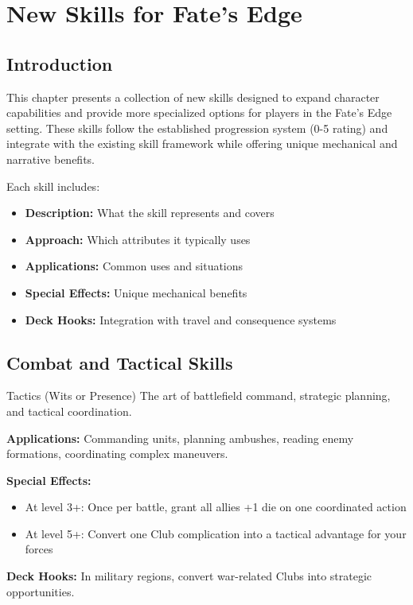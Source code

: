 \documentclass[11pt]{report}
\begin{document}
\chapter{New Skills for Fate's Edge}

\section*{Introduction}

This chapter presents a collection of new skills designed to expand character capabilities and provide more specialized options for players in the Fate's Edge setting. These skills follow the established progression system (0-5 rating) and integrate with the existing skill framework while offering unique mechanical and narrative benefits.

Each skill includes:
\begin{itemize}
    \item \textbf{Description:} What the skill represents and covers
    \item \textbf{Approach:} Which attributes it typically uses
    \item \textbf{Applications:} Common uses and situations
    \item \textbf{Special Effects:} Unique mechanical benefits
    \item \textbf{Deck Hooks:} Integration with travel and consequence systems
\end{itemize}

\section{Combat and Tactical Skills}

\begin{skillbox}{Tactics (Wits or Presence)}
The art of battlefield command, strategic planning, and tactical coordination.

\textbf{Applications:} Commanding units, planning ambushes, reading enemy formations, coordinating complex maneuvers.

\textbf{Special Effects:} 
\begin{itemize}
    \item At level 3+: Once per battle, grant all allies +1 die on one coordinated action
    \item At level 5+: Convert one Club complication into a tactical advantage for your forces
\end{itemize}

\textbf{Deck Hooks:} In military regions, convert war-related Clubs into strategic opportunities.
\end{skillbox}
\end{document}
